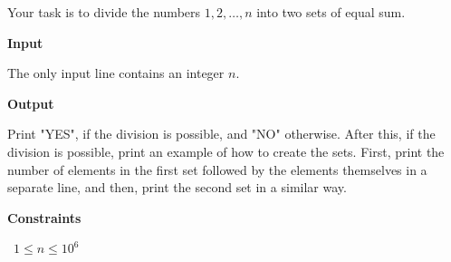 Your task is to divide the numbers $1,2,\ldots,n$ into two sets of equal sum.

\vspace{0.3cm}\noindent\textbf{Input}

The only input line contains an integer $n$.

\vspace{0.3cm}\noindent\textbf{Output}

Print "YES", if the division is possible, and "NO" otherwise.
After this, if the division is possible, print an example of how to create the sets. First, print the number of elements in the first set followed by the elements themselves in a separate line, and then, print the second set in a similar way.

\vspace{0.3cm}\noindent\textbf{Constraints}

\textbullet\ $1 \le n \le 10^6$